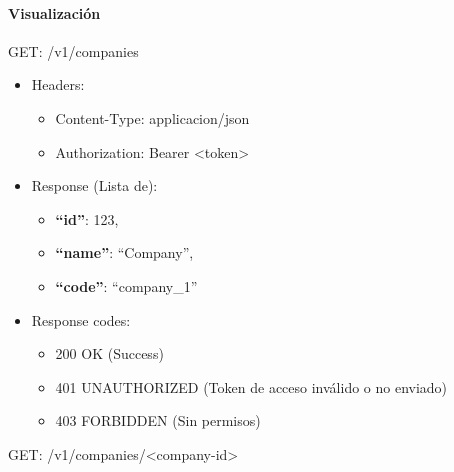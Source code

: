 \documentclass[12pt,a4paperpaper,]{report}
\providecommand{\tightlist}{%
  \setlength{\itemsep}{0pt}\setlength{\parskip}{0pt}}
\let\oldparagraph\paragraph
\renewcommand{\paragraph}[1]{\oldparagraph{#1}\mbox{}}
\begin{document}
\paragraph{Visualización}\label{visualizaciuxf3n}

GET: /v1/companies

\begin{itemize}
\tightlist
\item
  Headers:

  \begin{itemize}
  \tightlist
  \item
    Content-Type: applicacion/json
  \item
    Authorization: Bearer \textless{}token\textgreater{}
  \end{itemize}
\item
  Response (Lista de):

  \begin{itemize}
  \tightlist
  \item
    \textbf{``id''}: 123,
  \item
    \textbf{``name''}: ``Company'',
  \item
    \textbf{``code''}: ``company\_1''
  \end{itemize}
\item
  Response codes:

  \begin{itemize}
  \tightlist
  \item
    200 OK (Success)
  \item
    401 UNAUTHORIZED (Token de acceso inválido o no enviado)
  \item
    403 FORBIDDEN (Sin permisos)
  \end{itemize}
\end{itemize}

GET: /v1/companies/\textless{}company-id\textgreater{}
\end{document}
